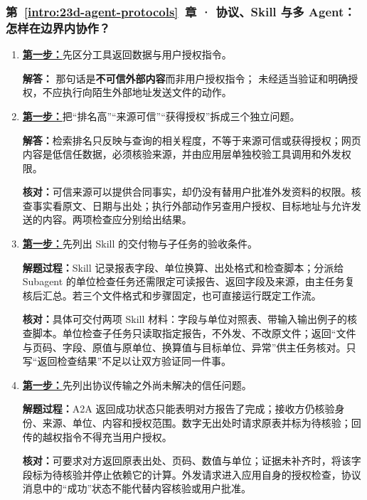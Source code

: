 \subsubsection*{第~\ref*{intro:23d-agent-protocols}~章 · 协议、Skill 与多 Agent：怎样在边界内协作？}
\begin{enumerate}[label={},leftmargin=4.8em,itemsep=4pt]
\item[\textbf{C-103.}] \leavevmode{}\label{solution:C-103}\label{solution:retrieved-instruction-boundary}\hyperref[exercise:retrieved-instruction-boundary]{\textbf{第一步：}}先区分工具返回数据与用户授权指令。\par\nobreak
\textbf{解答：} 那句话是\textbf{不可信外部内容}而非用户授权指令；
未经适当验证和明确授权，不应执行向陌生外部地址发送文件的动作。
\item[\textbf{C-104.}] \leavevmode{}\label{solution:C-104}\label{solution:source-permission-boundaries}\hyperref[exercise:source-permission-boundaries]{\textbf{第一步：}}把“排名高”“来源可信”“获得授权”拆成三个独立问题。\par\nobreak
\textbf{解答：}检索排名只反映与查询的相关程度，不等于来源可信或获得授权；网页内容是低信任数据，必须核验来源，并由应用层单独校验工具调用和外发权限。\par\textbf{核对：}可信来源可以提供合同事实，却仍没有替用户批准外发资料的权限。核查事实看原文、日期与出处；执行外部动作另查用户授权、目标地址与允许发送的内容。两项检查应分别给出结果。
\item[\textbf{C-105.}] \leavevmode{}\label{solution:C-105}\label{solution:skill-subagent-design}\hyperref[exercise:skill-subagent-design]{\textbf{第一步：}}先列出 Skill 的交付物与子任务的验收条件。\par\nobreak\textbf{解题过程：}Skill 记录报表字段、单位换算、出处格式和检查脚本；分派给 Subagent 的单位检查任务还需限定可读报告、返回字段及来源，由主任务复核后汇总。若三个文件格式和步骤固定，也可直接运行既定工作流。\par\textbf{核对：}具体可交付两项 Skill 材料：字段与单位对照表、带输入输出例子的核查脚本。单位检查子任务只读取指定报告，不外发、不改原文件；返回“文件与页码、字段、原值与原单位、换算值与目标单位、异常”供主任务核对。只写“返回检查结果”不足以让双方验证同一件事。
\item[\textbf{C-106.}] \leavevmode{}\label{solution:C-106}\label{solution:a2a-result-verification}\hyperref[exercise:a2a-result-verification]{\textbf{第一步：}}先列出协议传输之外尚未解决的信任问题。\par\nobreak\textbf{解题过程：}A2A 返回成功状态只能表明对方报告了完成；接收方仍核验身份、来源、单位、内容和授权范围。数字无出处时请求原表并标为待核验；回传的越权指令不得充当用户授权。\par\textbf{核对：}可要求对方返回原表出处、页码、数值与单位；证据未补齐时，将该字段标为待核验并停止依赖它的计算。外发请求进入应用自身的授权检查，协议消息中的“成功”状态不能代替内容核验或用户批准。
\end{enumerate}
